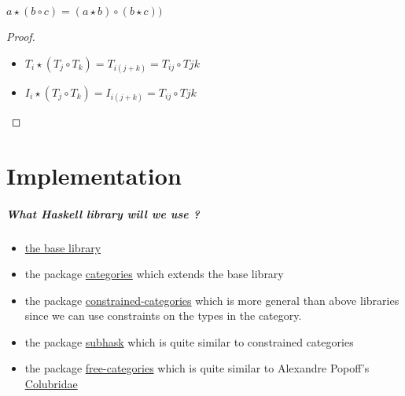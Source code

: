 \documentclass{report}
\begin{document}
\begin{prop}
    $a \star (b \circ c) = (a \star b) \circ (b \star c)) $
\end{prop}
\begin{proof}
    \begin{itemize}
        \item $T_i \star (T_j \circ T_k) = T_{i(j+k)} = T_{ij}\circ T{jk}$
        \item $I_i \star (T_j \circ T_k) = I_{i(j+k)} = T_{ij}\circ T{jk}$
    \end{itemize}
\end{proof}


\chapter{Implementation}
\paragraph{What Haskell library will we use ?}
\begin{itemize}
    \item \href{http://hackage.haskell.org/package/base-4.7.0.1/docs/Control-Category.html}{the base library}
    \item the package \href{https://hackage.haskell.org/package/categories}{categories} which extends the base library
    \item the package \href{https://hackage.haskell.org/package/constrained-categories}{constrained-categories} which is more general than above libraries since we can use constraints on the types in the category.
    \item the package \href{https://hackage.haskell.org/package/subhask-0.1.1.0}{subhask} which is quite similar to constrained categories
    \item the package \href{https://hackage.haskell.org/package/free-categories}{free-categories} which is quite similar to Alexandre Popoff's \href{https://github.com/AlexPof/colubridae}{Colubridae}
\end{itemize}
\newpage



\end{document}
